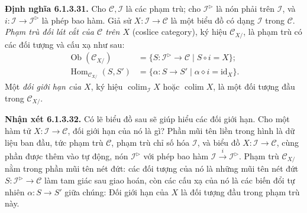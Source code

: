 \noindent\textbf{Định nghĩa 6.1.3.31.} Cho $\mathcal C,\mathcal I$ là các phạm trù; cho $\mathcal I^{\triangleright}$ là nón phải trên $\mathcal I$, và $i:\mathcal I\to\mathcal I^{\triangleright}$ là phép bao hàm. Giả sử $X:\mathcal I\to\mathcal C$ là một biểu đồ có dạng $\mathcal I$ trong $\mathcal C$. \emph{Phạm trù đối lát cắt của $\mathcal C$ trên $X$} (coslice category), ký hiệu $\mathcal C_{X/}$, là phạm trù có các đối tượng và cấu xạ như sau:
\[\begin{aligned}\operatorname{Ob}(\mathcal C_{X/})&=\{S:\mathcal I^{\triangleright}\to\mathcal C\mid S\circ i=X\};\\\operatorname{Hom}_{\mathcal C_{X/}}(S,S')&=\{\alpha:S\to S'\mid\alpha\diamond i=\mathrm{id}_X\}.\end{aligned}\]
Một \emph{đối giới hạn của $X$}, ký hiệu $\operatorname{colim}_{\mathcal I}X$ hoặc $\operatorname{colim}X$, là một đối tượng đầu trong $\mathcal C_{X/}$.

\noindent\textbf{Nhận xét 6.1.3.32.} Có lẽ biểu đồ sau sẽ giúp hiểu các đối giới hạn. Cho một hàm tử $X:\mathcal I\to\mathcal C$, đối giới hạn của nó là gì? Phần mũi tên liền trong hình là dữ liệu ban đầu, tức phạm trù $\mathcal C$, phạm trù chỉ số hóa $\mathcal I$, và biểu đồ $X:\mathcal I\to\mathcal C$, cùng phần được thêm vào tự động, nón $\mathcal I^{\triangleright}$ với phép bao hàm $\mathcal I\xrightarrow i\mathcal I^{\triangleright}$. Phạm trù $\mathcal C_{X/}$ nằm trong phần mũi tên nét đứt: các đối tượng của nó là những mũi tên nét đứt $S:\mathcal I^{\triangleright}\to\mathcal C$ làm tam giác sau giao hoán, còn các cấu xạ của nó là các biến đổi tự nhiên $\alpha:S\to S'$ giữa chúng:
\ctVIextension{\triangleright}
Đối giới hạn của $X$ là đối tượng đầu trong phạm trù này.

